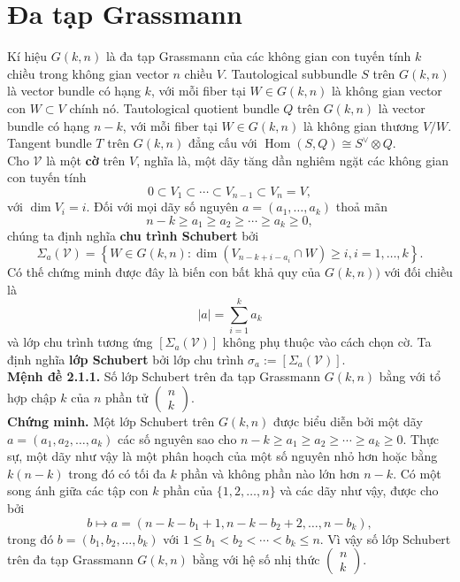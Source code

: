 \documentclass[11pt,a4paper]{book}
\begin{document}
\section{Đa tạp Grassmann}
Kí hiệu \( G(k, n) \) là đa tạp Grassmann của các không gian con tuyến tính \( k \) chiều trong không gian vector \( n \) chiều \( V \). Tautological subbundle \( S \) trên \( G(k, n) \) là vector bundle có hạng \( k \), với mỗi fiber tại \( W \in G(k, n) \) là không gian vector con \( W \subset V \) chính nó. Tautological quotient bundle \( Q \) trên \( G(k, n) \) là vector bundle có hạng \( n-k \), với mỗi fiber tại \( W \in G(k, n) \) là không gian thương \( V / W \). Tangent bundle \( T \) trên \( G(k, n) \) đẳng cấu với \( \operatorname{Hom}(S, Q) \cong S^{\vee} \otimes Q \).\\
Cho \( \mathcal{V} \) là một \textbf{cờ} trên \( V \), nghĩa là, một dãy tăng dần nghiêm ngặt các không gian con tuyến tính
\[
0 \subset V_1 \subset \cdots \subset V_{n-1} \subset V_n=V,
\]
với \( \operatorname{dim} V_i=i \). Đối với mọi dãy số nguyên \( a=\left(a_1, \ldots, a_k\right) \) thoả mãn
\[
n-k \geq a_1 \geq a_2 \geq \cdots \geq a_k \geq 0,
\]
chúng ta định nghĩa \textbf{chu trình Schubert} bởi
\[
\Sigma_a(\mathcal{V})=\left\{W \in G(k, n): \operatorname{dim}\left(V_{n-k+i-a_i} \cap W\right) \geq i, i=1, \ldots, k\right\}.
\]
Có thế chứng minh được đây là biến con bất khả quy của $G(k,n))$ với đối chiều là
$$|a|=\sum_{i=1}^{k}a_k$$
và lớp chu trình tương ứng $\left[\Sigma_a(\mathcal{V})\right]$ không phụ thuộc vào cách chọn cờ. Ta định nghĩa \textbf{lớp Schubert} bởi lớp chu trình $\sigma_a:=\left[\Sigma_a(\mathcal{V})\right]$.\\
\textbf{Mệnh đề 2.1.1.}
Số lớp Schubert trên đa tạp Grassmann \( G(k, n) \) bằng với tổ hợp chập $k$ của $n$ phần tử \( \left(\begin{array}{l}n \\ k\end{array}\right) \).\\
\textbf{Chứng minh.}
Một lớp Schubert trên \( G(k, n) \) được biểu diễn bởi một dãy \( a=\left(a_1, a_2, \ldots, a_k\right) \) các số nguyên sao cho \( n-k \geq a_1 \geq a_2 \geq \cdots \geq a_k \geq 0 \). Thực sự, một dãy như vậy là một phân hoạch của một số nguyên nhỏ hơn hoặc bằng \( k(n-k) \) trong đó có tối đa \( k \) phần và không phần nào lớn hơn \( n-k \). Có một song ánh giữa các tập con \( k \) phần của \( \{1,2, \ldots, n\} \) và các dãy như vậy, được cho bởi
\[
b \longmapsto a=\left(n-k-b_1+1, n-k-b_2+2, \ldots, n-b_k\right),
\]
trong đó \( b=\left(b_1, b_2, \ldots, b_k\right) \) với \( 1 \leq b_1<b_2<\cdots<b_k \leq n \). Vì vậy số lớp Schubert trên đa tạp Grassmann \( G(k, n) \) bằng với hệ số nhị thức \( \left(\begin{array}{l}n \\ k\end{array}\right) \).\\
\end{document}

